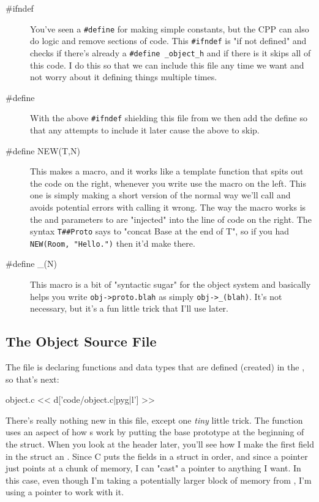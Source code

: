 \begin{description}

\item[\#ifndef] You've seen a \verb|#define| for making simple constants, but
    the CPP can also do logic and remove sections of code.  This \verb|#ifndef| is
    "if not defined" and checks if there's already a \verb|#define _object_h| and
    if there is it skips all of this code.  I do this so that we can include
    this file any time we want and not worry about it defining things multiple
    times.
\item[\#define] With the above \verb|#ifndef| shielding this file from we then
    add the  define so that any attempts to include it later
    cause the above to skip.
\item[\#define NEW(T,N)]  This makes a macro, and it works like a template function
    that spits out the code on the right, whenever you write use the macro
    on the left.  This one is simply making a short version of the normal way
    we'll call  and avoids potential errors with calling it
    wrong.  The way the macro works is the  and  parameters
    to  are "injected" into the line of code on the right.  The
    syntax \verb|T##Proto| says to "concat Base at the end of T", so if you had
    \verb|NEW(Room, "Hello.")| then it'd make  there.
\item[\#define \_(N)] This macro is a bit of "syntactic sugar" for the object
    system and basically helps you write \verb|obj->proto.blah| as simply
    \verb|obj->_(blah)|.  It's not necessary, but it's a fun little trick
    that I'll use later.
\end{description}

\subsection{The Object Source File}

The  file is declaring functions and data types that are defined
(created) in the , so that's next:

\begin{code}{object.c}
<< d['code/object.c|pyg|l'] >>
\end{code}

There's really nothing new in this file, except one \emph{tiny} little trick.
The function  uses an aspect of how s work
by putting the base prototype at the beginning of the struct.  When you look
at the  header later, you'll see how I make the first field
in the struct an .  Since C puts the fields in a struct
in order, and since a pointer just points at a chunk of memory, I can
"cast" a pointer to anything I want.  In this case, even though I'm taking
a potentially larger block of memory from , I'm using a
 pointer to work with it.

